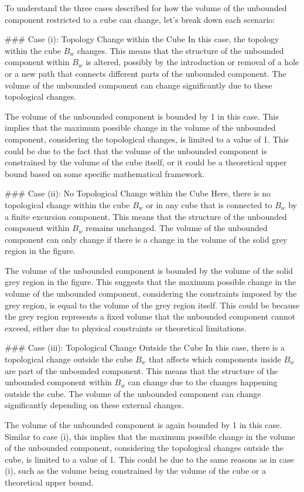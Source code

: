 To understand the three cases described for how the volume of the unbounded component restricted to a cube can change, let's break down each scenario:

### Case (i): Topology Change within the Cube
In this case, the topology within the cube \( B_w \) changes. This means that the structure of the unbounded component within \( B_w \) is altered, possibly by the introduction or removal of a hole or a new path that connects different parts of the unbounded component. The volume of the unbounded component can change significantly due to these topological changes.

The volume of the unbounded component is bounded by 1 in this case. This implies that the maximum possible change in the volume of the unbounded component, considering the topological changes, is limited to a value of 1. This could be due to the fact that the volume of the unbounded component is constrained by the volume of the cube itself, or it could be a theoretical upper bound based on some specific mathematical framework.

### Case (ii): No Topological Change within the Cube
Here, there is no topological change within the cube \( B_w \) or in any cube that is connected to \( B_w \) by a finite excursion component. This means that the structure of the unbounded component within \( B_w \) remains unchanged. The volume of the unbounded component can only change if there is a change in the volume of the solid grey region in the figure.

The volume of the unbounded component is bounded by the volume of the solid grey region in the figure. This suggests that the maximum possible change in the volume of the unbounded component, considering the constraints imposed by the grey region, is equal to the volume of the grey region itself. This could be because the grey region represents a fixed volume that the unbounded component cannot exceed, either due to physical constraints or theoretical limitations.

### Case (iii): Topological Change Outside the Cube
In this case, there is a topological change outside the cube \( B_w \) that affects which components inside \( B_w \) are part of the unbounded component. This means that the structure of the unbounded component within \( B_w \) can change due to the changes happening outside the cube. The volume of the unbounded component can change significantly depending on these external changes.

The volume of the unbounded component is again bounded by 1 in this case. Similar to case (i), this implies that the maximum possible change in the volume of the unbounded component, considering the topological changes outside the cube, is limited to a value of 1. This could be due to the same reasons as in case (i), such as the volume being constrained by the volume of the cube or a theoretical upper bound.

